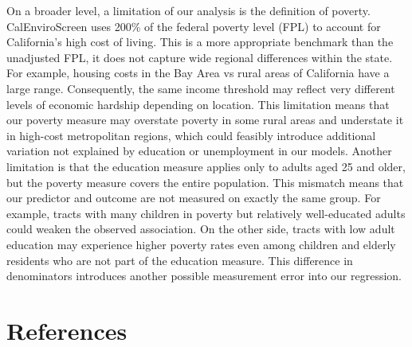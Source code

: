 \documentclass[
  letterpaper,
  DIV=11,
  numbers=noendperiod]{scrartcl}
\begin{document}
On a broader level, a limitation of our analysis is the definition of
poverty. CalEnviroScreen uses 200\% of the federal poverty level (FPL)
to account for California's high cost of living. This is a more
appropriate benchmark than the unadjusted FPL, it does not capture wide
regional differences within the state. For example, housing costs in the
Bay Area vs rural areas of California have a large range. Consequently,
the same income threshold may reflect very different levels of economic
hardship depending on location. This limitation means that our poverty
measure may overstate poverty in some rural areas and understate it in
high-cost metropolitan regions, which could feasibly introduce
additional variation not explained by education or unemployment in our
models. Another limitation is that the education measure applies only to
adults aged 25 and older, but the poverty measure covers the entire
population. This mismatch means that our predictor and outcome are not
measured on exactly the same group. For example, tracts with many
children in poverty but relatively well-educated adults could weaken the
observed association. On the other side, tracts with low adult education
may experience higher poverty rates even among children and elderly
residents who are not part of the education measure. This difference in
denominators introduces another possible measurement error into our
regression.

\section{References}\label{references}
\end{document}
